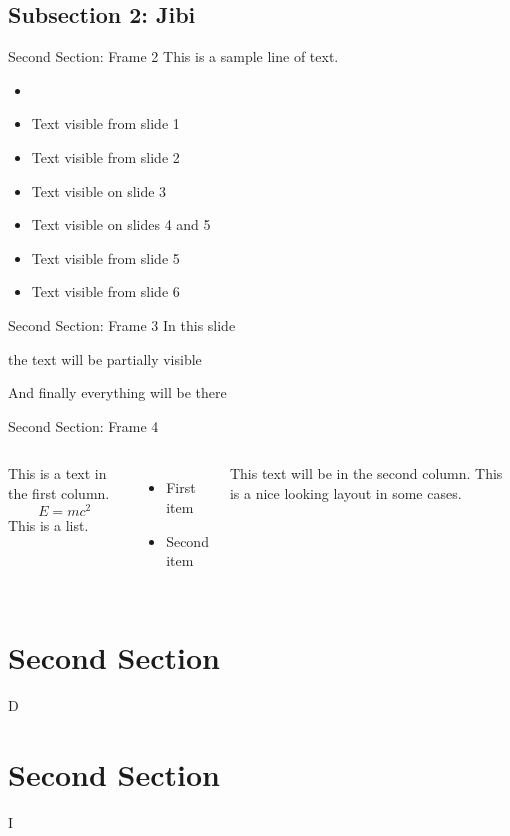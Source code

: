 \documentclass{beamer}
\begin{document}
\subsection{Subsection 2: Jibi}
\begin{frame}{Second Section: Frame 2}
This is a sample line of text.

\begin{itemize}
 \item<1->
 \item<1-> Text visible from slide 1 
 \item<2-> Text visible from slide 2
 \item<3> Text visible on slide 3
 \item<4-5> Text visible on slides 4 and 5
 \item<5-> Text visible from slide 5
 \item<6-> Text visible from slide 6
\end{itemize}
\end{frame}

\begin{frame}{Second Section: Frame 3}
 In this slide \pause

 the text will be partially visible \pause

 And finally everything will be there
\end{frame}

\begin{frame}{Second Section: Frame 4}

\begin{columns}
This is a text in the first column.
$$E=mc^2$$
This is a list.
\begin{itemize}
\item First item
\item Second item
\end{itemize}

This text will be in the second column.
This is a nice looking
layout in some cases.
\end{columns}
\end{frame}
\section{Second Section}
\begin{frame}
D
\end{frame}
\section{Second Section}
\begin{frame}
I
\end{frame}
\end{document}
